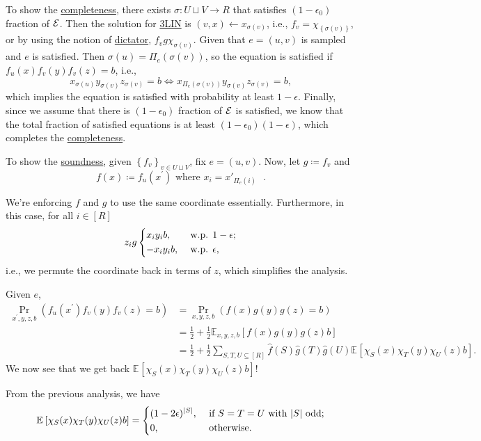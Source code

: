 To show the \hyperref[def:completeness]{completeness}, there exists \(\sigma \colon U \sqcup V \to R\) that satisfies \((1 - \epsilon _0)\) fraction of \(\mathcal{\MakeUppercase{e}} \). Then the solution for \hyperref[prb:max-3LIN]{3LIN} is \((v, x) \gets x_{\sigma (v)}\), i.e., \(f_v = \chi _{\left\{ \sigma (v) \right\} }\), or by using the notion of \hyperref[not:dictation]{dictator}, \(f_v g \chi _{\sigma (v)}\). Given that \(e=(u, v)\) is sampled and \(e\) is satisfied. Then \(\sigma (u) = \Pi _e(\sigma (v))\), so the equation is satisfied if \(f_u(x) f_v(y) f_v(z) = b\), i.e.,
\[
	x_{\sigma (u)} y_{\sigma (v)} z_{\sigma (v)} = b
	\iff x_{\Pi_e (\sigma (v))} y_{\sigma (v)} z_{\sigma (v)} = b,
\]
which implies the equation is satisfied with probability at least \(1 - \epsilon\). Finally, since we assume that there is \((1-\epsilon _0)\) fraction of \(\mathcal{\MakeUppercase{e}} \) is satisfied, we know that the total fraction of satisfied equations is at least \((1-\epsilon _0) (1-\epsilon )\), which completes the \hyperref[def:completeness]{completeness}.

To show the \hyperref[def:soundness]{soundness}, given \(\left\{ f_v \right\} _{v\in U \sqcup V}\), fix \(e=(u, v)\). Now, let \(g\coloneqq f_v\) and
\[
	f(x) \coloneqq f_u(x^\prime ) \text{ where \(x_i = x'_{\Pi_e(i)}\) }.
\]
\begin{note}
	We're enforcing \(f\) and \(g\) to use the same coordinate essentially. Furthermore, in this case, for all \(i\in [R]\)
	\[
		z_i g \begin{dcases}
			x_i y_i b,  & \text{ w.p. } 1-\epsilon  ; \\
			-x_i y_i b, & \text{ w.p. } \epsilon  ,
		\end{dcases}
	\]
	i.e., we permute the coordinate back in terms of \(z\), which simplifies the analysis.
\end{note}

Given \(e\),
\[
	\begin{split}
		\Pr_{x^\prime , y, z, b}(f_u(x^\prime ) f_v(y) f_v(z) = b)
		&= \Pr_{x , y, z, b}(f(x) g(y) g(z) = b)\\
		&= \frac{1}{2} + \frac{1}{2} \mathbb{E}_{x, y, z, b}\left[f(x) g(y) g(z) b \right]\\
		&= \frac{1}{2} + \frac{1}{2} \sum_{S, T, U \subseteq [R]} \hat{f} (S) \hat{g} (T) \hat{g} (U) \mathbb{E}_{}\left[\chi _S(x) \chi _T (y) \chi _U(z) b \right].
	\end{split}
\]
We now see that we get back \(\mathbb{E}_{}\left[\chi _S(x) \chi _T (y) \chi _U(z) b \right]\)!
\begin{prev}
	From the previous analysis, we have
	\[
		\mathbb{E}_{}\left[\chi _S(x) \chi _T (y) \chi _U(z) b \right]
		= \begin{dcases}
			(1-2\epsilon )^{\vert S \vert }, & \text{ if } S=T=U \text{ with \(\vert S \vert \) odd}  ; \\
			0,                               & \text{ otherwise}  .
		\end{dcases}
	\]
\end{prev}

